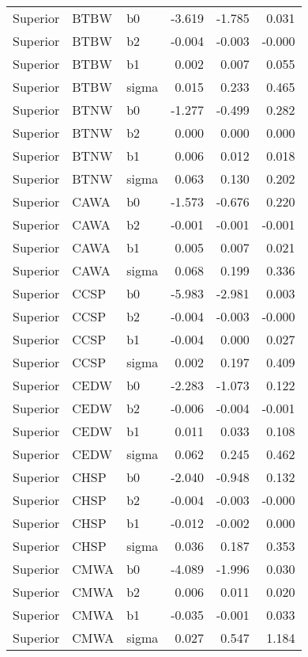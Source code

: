 \begin{table}[ht]
\begin{center}
\begin{tabular}{lllrrr}
  Superior & BTBW & b0 & -3.619 & -1.785 & 0.031 \\ 
  Superior & BTBW & b2 & -0.004 & -0.003 & -0.000 \\ 
  Superior & BTBW & b1 & 0.002 & 0.007 & 0.055 \\ 
  Superior & BTBW & sigma & 0.015 & 0.233 & 0.465 \\ 
  Superior & BTNW & b0 & -1.277 & -0.499 & 0.282 \\ 
  Superior & BTNW & b2 & 0.000 & 0.000 & 0.000 \\ 
  Superior & BTNW & b1 & 0.006 & 0.012 & 0.018 \\ 
  Superior & BTNW & sigma & 0.063 & 0.130 & 0.202 \\ 
  Superior & CAWA & b0 & -1.573 & -0.676 & 0.220 \\ 
  Superior & CAWA & b2 & -0.001 & -0.001 & -0.001 \\ 
  Superior & CAWA & b1 & 0.005 & 0.007 & 0.021 \\ 
  Superior & CAWA & sigma & 0.068 & 0.199 & 0.336 \\ 
  Superior & CCSP & b0 & -5.983 & -2.981 & 0.003 \\ 
  Superior & CCSP & b2 & -0.004 & -0.003 & -0.000 \\ 
  Superior & CCSP & b1 & -0.004 & 0.000 & 0.027 \\ 
  Superior & CCSP & sigma & 0.002 & 0.197 & 0.409 \\ 
  Superior & CEDW & b0 & -2.283 & -1.073 & 0.122 \\ 
  Superior & CEDW & b2 & -0.006 & -0.004 & -0.001 \\ 
  Superior & CEDW & b1 & 0.011 & 0.033 & 0.108 \\ 
  Superior & CEDW & sigma & 0.062 & 0.245 & 0.462 \\ 
  Superior & CHSP & b0 & -2.040 & -0.948 & 0.132 \\ 
  Superior & CHSP & b2 & -0.004 & -0.003 & -0.000 \\ 
  Superior & CHSP & b1 & -0.012 & -0.002 & 0.000 \\ 
  Superior & CHSP & sigma & 0.036 & 0.187 & 0.353 \\ 
  Superior & CMWA & b0 & -4.089 & -1.996 & 0.030 \\ 
  Superior & CMWA & b2 & 0.006 & 0.011 & 0.020 \\ 
  Superior & CMWA & b1 & -0.035 & -0.001 & 0.033 \\ 
  Superior & CMWA & sigma & 0.027 & 0.547 & 1.184 \\ 

\end{tabular}
\end{center}
\end{table}
